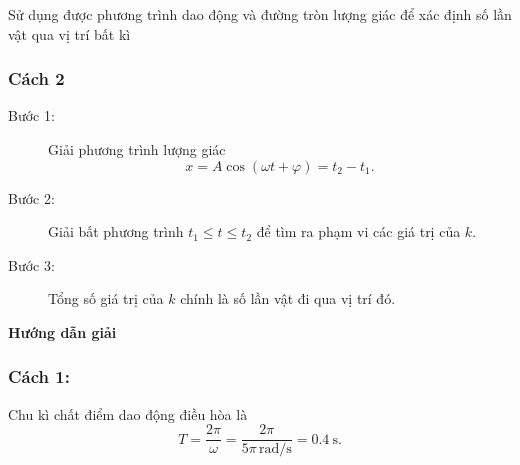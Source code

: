 \begin{dang}{Sử dụng được phương trình dao động và đường tròn lượng giác để xác định số lần vật qua vị trí bất kì}
{		\subsubsection{Cách 2}	
		\begin{description}
			\item[Bước 1:] Giải phương trình lượng giác
			\begin{equation*}
				x=A\cos(\omega t+\varphi)=t_2-t_1.
			\end{equation*}
			\manatip{
				\begin{equation*}
					\cos x=a\Leftrightarrow \cos x= \cos \alpha\ (-1\leq a \leq 1) \Leftrightarrow \left[
					\begin{matrix}
						x=\alpha+k2\pi\\
						x=-\alpha+k2\pi
					\end{matrix}
					\right.\ (k\in Z)
				\end{equation*}
			}
			\item[Bước 2:] Giải bất phương trình $t_1\leq t\leq t_2$ để tìm ra phạm vi các giá trị của $k$.
			\item[Bước 3:] Tổng số giá trị của $k$ chính là số lần vật đi qua vị trí đó.
		\end{description}	
	}
	{\begin{center}
			\textbf{Hướng dẫn giải}
		\end{center}
		
		\subsubsection{Cách 1:}
		
		Chu kì chất điểm dao động điều hòa là
		\begin{equation*}
			T=\dfrac{2\pi}{\omega}=\dfrac{2\pi}{5\pi\,\text{rad/s}}=\SI{0,4}{\second}.
		\end{equation*}
		
}
\end{dang}
